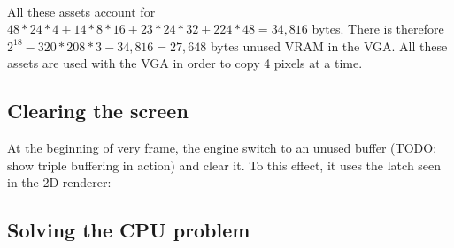     \begin{minipage}{.3\textwidth}
  \end{minipage}
\begin{minipage}{.3\textwidth}
  \end{minipage}
\begin{minipage}{.3\textwidth}
  \end{minipage}
\par


\begin{minipage}{.1\textwidth}
  \end{minipage}
\begin{minipage}{.1\textwidth}
  \end{minipage}
\begin{minipage}{.1\textwidth}
  \end{minipage}
\begin{minipage}{.1\textwidth}
  \end{minipage}
  \begin{minipage}{.3\textwidth}
  \end{minipage}
\begin{minipage}{.3\textwidth}
  \end{minipage}\


All these assets account for $48*24*4+14*8*16+23*24*32+224*48=34,816$ bytes. There is therefore $2^18-320*208*3 - 34,816=27,648$ bytes unused VRAM in the VGA.
All these assets are used with the VGA in order to copy 4 pixels at a time.


\subsection{Clearing the screen}
At the beginning of very frame, the engine switch to an unused buffer (TODO: show triple buffering in action) and clear it. To this effect, it uses the latch seen in the 2D renderer: 









\subsection{Solving the CPU problem}

